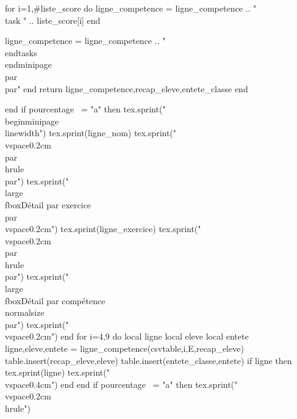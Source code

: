 \documentclass[fiche]{classe-tex3R}
\begin{document}
\begin{luacode*}
{                        for i=1,#liste_score do
                        ligne_competence = ligne_competence .. "\\task " .. liste_score[i]
                        end
    
                    ligne_competence = ligne_competence .. "\\end{tasks}\\end{minipage}\\par\\par"
                end
                return ligne_competence,recap_eleve,entete_classe
            end
            
        end
            if pourcentage ~= "a" then
                tex.sprint("\\begin{minipage}{\\linewidth}")
                tex.sprint(ligne_nom)
                tex.sprint("\\vspace{0.2cm}\\par\\hrule\\par")
                tex.sprint("\\large\\fbox{Détail par exercice}\\par\\vspace{0.2cm}")
                tex.sprint(ligne_exercice)
                tex.sprint("\\vspace{0.2cm}\\par\\hrule\\par")
                tex.sprint("\\large\\fbox{Détail par compétence}\\normalsize\\par")
                tex.sprint("\\vspace{0.2cm}")
            end
            for i=4,9 do
            local ligne
            local eleve
            local entete
            ligne,eleve,entete = ligne_competence(csvtable,i,E,recap_eleve)
            table.insert(recap_eleve,eleve)
            table.insert(entete_classe,entete)
                if ligne then
                    tex.sprint(ligne)
                    tex.sprint("\\vspace{0.4cm}")
                end
            end
                if pourcentage ~= "a" then
            tex.sprint("\\vspace{0.2cm}\\hrule")
}
\end{luacode*}
\end{document}
